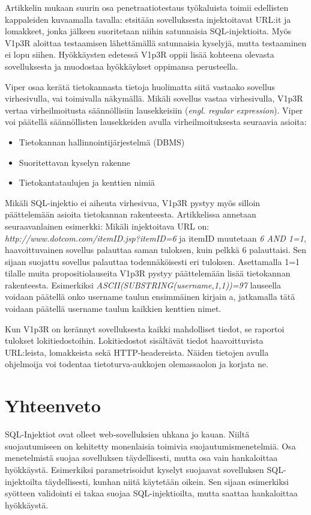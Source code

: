 \documentclass[finnish]{tktltiki2}
\theoremstyle{definition}
\theoremstyle{remark}
\begin{document}
	Artikkelin mukaan suurin osa penetraatiotestaus työkaluista toimii edellisten kappaleiden kuvaamalla tavalla: etsitään sovelluksesta injektoitavat URL:it ja lomakkeet, jonka jälkeen suoritetaan niihin satunnaisia SQL-injektioita. Myös V1p3R aloittaa testaamisen lähettämällä satunnaisia kyselyjä, mutta testaaminen ei lopu siihen. Hyökkäysten edetessä V1p3R oppii lisää kohteena olevasta sovelluksesta ja muodostaa hyökkäykset oppimansa perusteella.
	
	 Viper osaa kerätä tietokannasta tietoja huolimatta siitä vastaako sovellus virhesivulla, vai toimivalla näkymällä. Mikäli sovellus vastaa virhesivulla, V1p3R vertaa virheilmoitusta säännöllisiin lausekkeisiin (\textit{engl. regular expression}). Viper voi päätellä säännöllisten lausekkeiden avulla virheilmoituksesta seuraavia asioita:
	 \begin{itemize}
	 	\item Tietokannan hallinnointijärjestelmä (DBMS)
	    \item Suoritettavan kyselyn rakenne
		\item Tietokantataulujen ja kenttien nimiä
	\end{itemize}
	
	Mikäli SQL-injektio ei aiheuta virhesivua, V1p3R pystyy myös silloin päättelemään asioita tietokannan rakenteesta. Artikkelissa annetaan seuraavanlainen esimerkki: Mikäli injektoitava URL on: \textit{http://www.dotcom.com/itemID.\linebreak jsp?itemID=6} ja itemID muutetaan \textit{6 AND 1=1}, haavoittuvainen sovellus palauttaa saman tuloksen, kuin pelkkä 6 palauttaisi. Sen sijaan suojattu sovellus palauttaa todennäköisesti eri tuloksen. Asettamalla 1=1 tilalle muita propositiolauseita V1p3R pystyy päättelemään lisää tietokannan rakenteesta. Esimerkiksi \textit{ASCII(SUBSTRING(username,1,1))=97 } lauseella voidaan päätellä onko username taulun ensimmäinen kirjain a, jatkamalla tätä voidaan päätellä username taulun kaikkien kenttien nimet.
	
	Kun V1p3R on kerännyt sovelluksesta kaikki mahdolliset tiedot, se raportoi tulokset lokitiedostoihin. Lokitiedostot sisältävät tiedot haavoittuvista URL:leista, lomakkeista sekä HTTP-headereista. Näiden tietojen avulla ohjelmoija voi todentaa tietoturva-aukkojen olemassaolon ja korjata ne.
	
	
	\section {Yhteenveto}
	SQL-Injektiot ovat olleet web-sovelluksien uhkana jo kauan. Niiltä suojautumiseen on kehitetty monenlaisia toimivia suojautumismenetelmiä. Osa menetelmistä suojaa sovelluksen täydellisesti, mutta osa vain hankaloittaa hyökkäystä. Esimerkiksi parametrisoidut kyselyt suojaavat sovelluksen SQL-injektoilta täydellisesti, kunhan niitä käytetään oikein. Sen sijaan esimerkiksi syötteen validointi ei takaa suojaa SQL-injektioilta, mutta saattaa hankaloittaa hyökkäystä.
	
\end{document}
